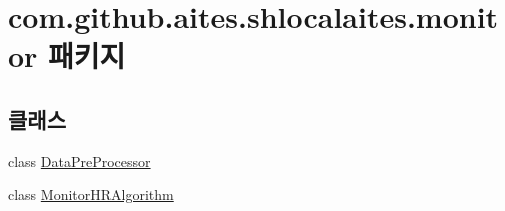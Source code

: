 \hypertarget{namespacecom_1_1github_1_1aites_1_1shlocalaites_1_1monitor}{}\section{com.\+github.\+aites.\+shlocalaites.\+monitor 패키지}
\label{namespacecom_1_1github_1_1aites_1_1shlocalaites_1_1monitor}
\subsection*{클래스}
\begin{DoxyCompactItemize}
\item 
class \mbox{\hyperlink{classcom_1_1github_1_1aites_1_1shlocalaites_1_1monitor_1_1_data_pre_processor}{Data\+Pre\+Processor}}
\item 
class \mbox{\hyperlink{classcom_1_1github_1_1aites_1_1shlocalaites_1_1monitor_1_1_monitor_h_r_algorithm}{Monitor\+H\+R\+Algorithm}}
\end{DoxyCompactItemize}
